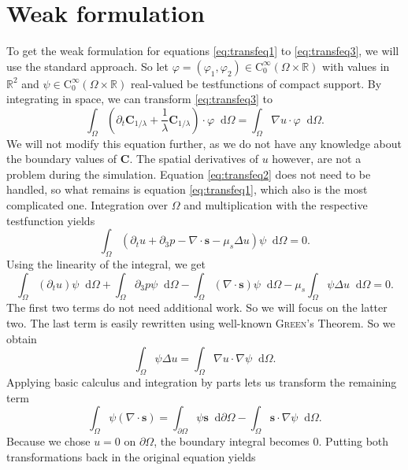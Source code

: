 \documentclass[12pt,a4paper,twoside, open=right]{scrreprt}
\theoremstyle{definition}
\theoremstyle{plain}
\newcommand{\rr}{\mathbb{R}}
\newcommand{\bfs}{\bm{s}}
\newcommand{\bfC}{\bm{C}}
\newcommand{\D}{\mathop{}\!\mathrm{d}}
\begin{document}
\section{Weak formulation}
To get the weak formulation for equations \eqref{eq:transfeq1} to \eqref{eq:transfeq3}, we will use the standard approach. So let $\varphi = (\varphi_1,\varphi_2)\in \mathrm{C}^\infty_0(\Omega\times\rr)$ with values in $\rr^2$ and $\psi\in \mathrm{C}^\infty_0(\Omega\times\rr)$ real-valued be testfunctions of compact support. By integrating in space, we can transform \eqref{eq:transfeq3} to 
\begin{equation}
    \int_\Omega(\partial_t\bfC_{1/\lambda}+\frac{1}{\lambda}\bfC_{1/\lambda})\cdot\varphi\D\Omega = 
   \int_\Omega \nabla u\cdot \varphi\D\Omega.
\end{equation}
We will not modify this equation further, as we do not have any knowledge about the boundary values of $\bfC$. The spatial derivatives of $u$ however, are not a problem during the simulation. Equation \eqref{eq:transfeq2} does not need to be handled, so what remains is equation \eqref{eq:transfeq1}, which also is the most complicated one. Integration over $\Omega$ and multiplication with the respective testfunction yields
\begin{equation}
    \int_\Omega(\partial_t u + \partial_3 p -\nabla\cdot \bfs -\mu_s\Delta u)\psi\D\Omega = 0.
\end{equation}
Using the linearity of the integral, we get
\begin{equation}
    \int_\Omega(\partial_t u)\psi\D\Omega +\int_\Omega\partial_3 p\psi\D\Omega -\int_\Omega(\nabla\cdot \bfs)\psi\D\Omega -\mu_s\int_\Omega\psi\Delta u\D\Omega=0.
\end{equation}
The first two terms do not need additional work. So we will focus on the latter two. The last term is easily rewritten using well-known \textsc{Green}'s Theorem. So we obtain
\begin{equation}
    \int_\Omega \psi\Delta u = \int_\Omega\nabla u\cdot \nabla\psi\D\Omega.
\end{equation}
Applying basic calculus and integration by parts lets us transform the remaining term
\begin{equation}
    \int_\Omega \psi(\nabla\cdot\bfs) =\int_{\partial\Omega}\psi\bfs\D\partial\Omega -\int_\Omega\bfs\cdot\nabla\psi\D\Omega.
\end{equation}
Because we chose $u = 0$ on $\partial\Omega$, the boundary integral becomes $0$. Putting both transformations back in the original equation yields
\end{document}
